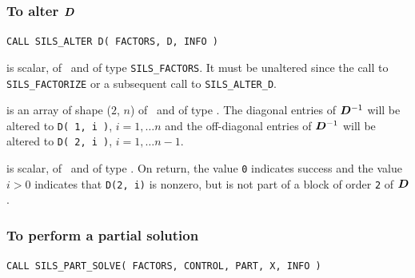\documentclass{galahad}
\newcommand{\packagename}{SILS}
\begin{document}
\subsubsection{To alter ${\bm{D}}$}
 
\hskip0.5in 
{\tt CALL \packagename\_ALTER D( FACTORS, D, INFO )}
 
\begin{description} 
 is scalar, of \intentinout\ and of type 
{\tt \packagename\_FACTORS}. It 
must be unaltered since the call to {\tt \packagename\_FACTOR\-IZE}  
or a subsequent call to {\tt \packagename\_ALTER\_D}. 
  
 is an array of shape ($2$, $n$) of \intentinout\, and of 
type \realdp. The diagonal entries of ${\bm{D}}^{-1} $ will 
be altered to {\tt D( 1, i )}, $i = 1, \ldots n$ and the off-diagonal 
entries of ${\bm{D}}^{-1} $ will be altered to {\tt D( 2, i )}, 
$i = 1, \ldots n-1$. 
 
 is scalar, of \intentout\, and of type \integer.  On return, 
the value {\tt 0} indicates success and the value $i > 0$ indicates that  
{\tt D(2, i)} is nonzero, but is not part of a block of order 
{\tt 2} of ${\bm{D}}$. 
 
\end{description} 

\subsubsection{To perform a partial solution}
 
\hskip0.5in 
{\tt CALL \packagename\_PART\_SOLVE( FACTORS, CONTROL, PART, X, INFO )}
 
\end{document}
